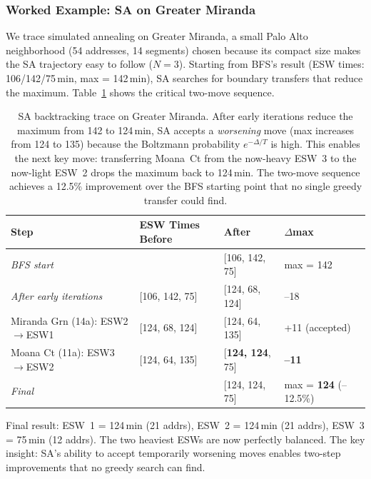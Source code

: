 \documentclass[conference]{IEEEtran}
\begin{document}
\subsubsection{Worked Example: SA on Greater Miranda}
\label{sec:sa-trace}

We trace simulated annealing on Greater Miranda, a small Palo Alto neighborhood (54 addresses, 14 segments) chosen because its compact size makes the SA trajectory easy to follow ($N = 3$). Starting from BFS's result (ESW times: 106/142/75\,min, max = 142\,min), SA searches for boundary transfers that reduce the maximum. Table~\ref{tab:sa-trace} shows the critical two-move sequence.

\begin{table}[htbp]
\caption{SA backtracking trace on Greater Miranda. After early iterations reduce the maximum from 142 to 124\,min, SA accepts a \emph{worsening} move (max increases from 124 to 135) because the Boltzmann probability $e^{-\Delta/T}$ is high. This enables the next key move: transferring Moana~Ct from the now-heavy ESW~3 to the now-light ESW~2 drops the maximum back to 124\,min. The two-move sequence achieves a 12.5\% improvement over the BFS starting point that no single greedy transfer could find.}
\label{tab:sa-trace}
\begin{center}
\begin{tabular}{llll}
\toprule
\textbf{Step} & \textbf{ESW Times Before} & \textbf{After} & \textbf{$\Delta$max} \\
\midrule
\emph{BFS start} & & [106, 142, 75] & max = 142 \\
\emph{After early iterations} & [106, 142, 75] & [124, 68, 124] & --18 \\
Miranda Grn (14a): ESW2$\to$ESW1 & [124, 68, 124] & [124, 64, 135] & +11 (accepted) \\
Moana Ct (11a): ESW3$\to$ESW2 & [124, 64, 135] & [\textbf{124, 124}, 75] & \textbf{--11} \\
\midrule
\emph{Final} & & [124, 124, 75] & max = \textbf{124} (--12.5\%) \\
\bottomrule
\end{tabular}
\end{center}
\end{table}

Final result: ESW~1 = 124\,min (21 addrs), ESW~2 = 124\,min (21 addrs), ESW~3 = 75\,min (12 addrs). The two heaviest ESWs are now perfectly balanced. The key insight: SA's ability to accept temporarily worsening moves enables two-step improvements that no greedy search can find.
\end{document}
